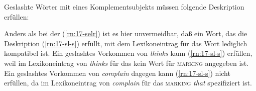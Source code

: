 \documentclass[output=paper]{LSP/langsci}
\begin{document}
{\randnum}Geslashte Wörter mit  eines Komplementsubjekts müssen folgende Deskription erfüllen:
\begin{exe}
\label{rn:17-sl-s}
\end{exe}
\randnum\label{rn:17-74}Anders als bei der  (\ref{rn:17-selr}) ist es hier
unvermeidbar, daß ein Wort, das die Deskription (\ref{rn:17-sl-s}) erfüllt, mit dem
Lexikoneintrag für das Wort lediglich kompatibel ist. Ein geslashtes
Vorkommen von \textit{thinks} \zb kann (\ref{rn:17-sl-s}) erfüllen, weil im
Lexikoneintrag von \textit{thinks} für das  kein Wert für
\textsc{marking} angegeben ist. Ein geslashtes Vorkommen von \textit{complain}
dagegen kann (\ref{rn:17-sl-s}) nicht erfüllen, da im Lexikoneintrag von \textit{complain}
für das  \textsc{marking} \textit{that} spezifiziert ist.
\end{document}
